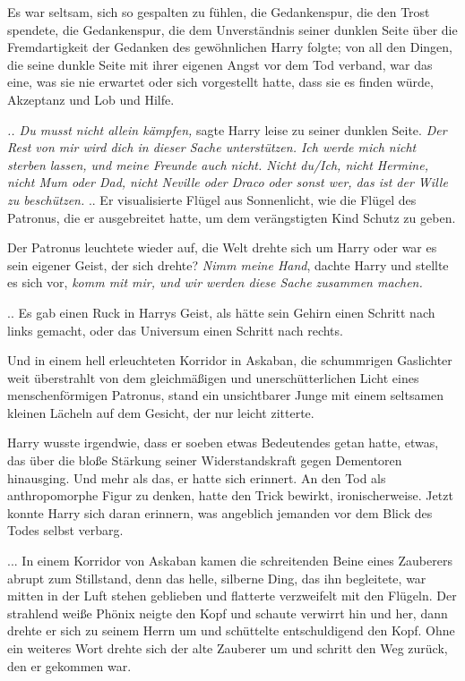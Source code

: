 Es war seltsam, sich so gespalten zu fühlen, die Gedankenspur, die den Trost
spendete, die Gedankenspur, die dem Unverständnis seiner dunklen Seite über die
Fremdartigkeit der Gedanken des gewöhnlichen Harry folgte; von all den Dingen,
die seine dunkle Seite mit ihrer eigenen Angst vor dem Tod verband, war das
eine, was sie nie erwartet oder sich vorgestellt hatte, dass sie es finden
würde, Akzeptanz und Lob und Hilfe.

\emph{.. Du musst nicht allein kämpfen,} sagte Harry leise zu seiner dunklen
Seite.\emph{ Der Rest von mir wird dich in dieser Sache unterstützen. Ich werde
mich nicht sterben lassen, und meine Freunde auch nicht. Nicht du/Ich, nicht
Hermine, nicht Mum oder Dad, nicht Neville oder Draco oder sonst wer, das ist
der Wille zu beschützen.} .. Er visualisierte Flügel aus Sonnenlicht, wie die
Flügel des Patronus, die er ausgebreitet hatte, um dem verängstigten Kind Schutz
zu geben.

Der Patronus leuchtete wieder auf, die Welt drehte sich um Harry oder war es
sein eigener Geist, der sich drehte? \emph{Nimm meine Hand}, dachte Harry und
stellte es sich vor, \emph{komm mit mir, und wir werden diese Sache zusammen
machen.}

.. Es gab einen Ruck in Harrys Geist, als hätte sein Gehirn einen Schritt nach
links gemacht, oder das Universum einen Schritt nach rechts.

Und in einem hell erleuchteten Korridor in Askaban, die schummrigen Gaslichter
weit überstrahlt von dem gleichmäßigen und unerschütterlichen Licht eines
menschenförmigen Patronus, stand ein unsichtbarer Junge mit einem seltsamen
kleinen Lächeln auf dem Gesicht, der nur leicht zitterte.

Harry wusste irgendwie, dass er soeben etwas Bedeutendes getan hatte, etwas, das
über die bloße Stärkung seiner Widerstandskraft gegen Dementoren hinausging. Und
mehr als das, er hatte sich erinnert. An den Tod als anthropomorphe Figur zu
denken, hatte den Trick bewirkt, ironischerweise. Jetzt konnte Harry sich daran
erinnern, was angeblich jemanden vor dem Blick des Todes selbst verbarg.


... In einem Korridor von Askaban kamen die schreitenden Beine eines Zauberers
abrupt zum Stillstand, denn das helle, silberne Ding, das ihn begleitete, war
mitten in der Luft stehen geblieben und flatterte verzweifelt mit den Flügeln.
Der strahlend weiße Phönix neigte den Kopf und schaute verwirrt hin und her,
dann drehte er sich zu seinem Herrn um und schüttelte entschuldigend den Kopf.
Ohne ein weiteres Wort drehte sich der alte Zauberer um und schritt den Weg
zurück, den er gekommen war.



